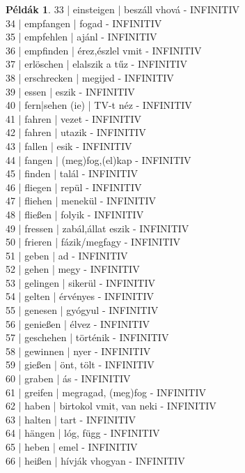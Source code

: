 \documentclass{article}
\theoremstyle{definition}
\newtheorem*{exmp}{Példák}
\begin{document}
\begin{exmp}
33 | einsteigen | beszáll vhová - INFINITIV\\
34 | empfangen | fogad - INFINITIV\\
35 | empfehlen | ajánl - INFINITIV\\
36 | empfinden | érez,észlel vmit - INFINITIV\\
37 | erlöschen | elalszik a tűz - INFINITIV\\
38 | erschrecken | megijed - INFINITIV\\
39 | essen | eszik - INFINITIV\\
40 | fern|sehen (ie) | TV-t néz - INFINITIV\\
41 | fahren | vezet - INFINITIV\\
42 | fahren | utazik - INFINITIV\\
43 | fallen | esik - INFINITIV\\
44 | fangen | (meg)fog,(el)kap - INFINITIV\\
45 | finden | talál - INFINITIV\\
46 | fliegen | repül - INFINITIV\\
47 | fliehen | menekül - INFINITIV\\
48 | fließen | folyik - INFINITIV\\
49 | fressen | zabál,állat eszik - INFINITIV\\
50 | frieren | fázik/megfagy - INFINITIV\\
51 | geben | ad - INFINITIV\\
52 | gehen | megy - INFINITIV\\
53 | gelingen | sikerül - INFINITIV\\
54 | gelten | érvényes - INFINITIV\\
55 | genesen | gyógyul - INFINITIV\\
56 | genießen | élvez - INFINITIV\\
57 | geschehen | történik - INFINITIV\\
58 | gewinnen | nyer - INFINITIV\\
59 | gießen | önt, tölt - INFINITIV\\
60 | graben | ás - INFINITIV\\
61 | greifen | megragad, (meg)fog - INFINITIV\\
62 | haben | birtokol vmit, van neki - INFINITIV\\
63 | halten | tart - INFINITIV\\
64 | hängen | lóg, függ - INFINITIV\\
65 | heben | emel - INFINITIV\\
66 | heißen | hívják vhogyan - INFINITIV\\

\end{exmp}
\end{document}
